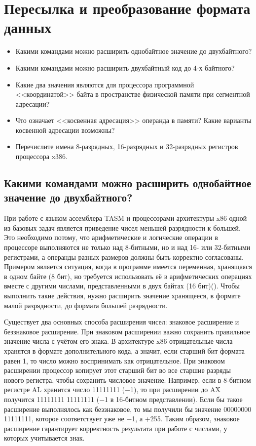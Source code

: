 \chapter{Пересылка и преобразование формата данных}
\begin{itemize}
\item Какими командами можно расширить однобайтное значение до двухбайтного?
\item Какими командами можно расширить двухбайтный код до 4-х байтного?
\item Какие два значения являются для процессора программной <<координатой>> байта в пространстве физической памяти при сегментной адресации?
\item Что означает <<косвенная адресация>> операнда в памяти? Какие варианты косвенной адресации возможны?
\item Перечислите имена 8-разрядных, 16-разрядных и 32-разрядных регистров процессора x386.
\end{itemize}

\section{Какими командами можно расширить однобайтное значение до двухбайтного?}

При работе с языком ассемблера TASM и процессорами архитектуры x86 одной из базовых задач является приведение чисел меньшей разрядности к большей. Это необходимо потому, что арифметические и логические операции в процессоре выполняются не только над 8-битными, но и над 16- или 32-битными регистрами, а операнды разных размеров должны быть корректно согласованы. Примером является ситуация, когда в программе имеется переменная, хранящаяся в одном байте (8 бит), но требуется использовать её в арифметических операциях вместе с другими числами, представленными в двух байтах (16 бит)(). Чтобы выполнить такие действия, нужно расширить значение хранящееся, в формате малой разрядности, до формата большей разрядности.

Существует два основных способа расширения чисел: знаковое расширение и беззнаковое расширение. При знаковом расширении важно сохранить правильное значение числа с учётом его знака. В архитектуре x86 отрицательные числа хранятся в формате дополнительного кода, а значит, если старший бит формата равен 1, то число можно воспринимать как отрицательное. При знаковом расширении процессор копирует этот старший бит во все старшие разряды нового регистра, чтобы сохранить числовое значение. Например, если в 8-битном регистре AL хранится число 11111111 (−1), то при расширении до AX получится 11111111 11111111 (−1 в 16-битном представлении). Если бы такое расширение выполнялось как беззнаковое, то мы получили бы значение 00000000 11111111, которое соответствует уже не −1, а +255. Таким образом, знаковое расширение гарантирует корректность результата при работе с числами, у которых учитывается знак.

